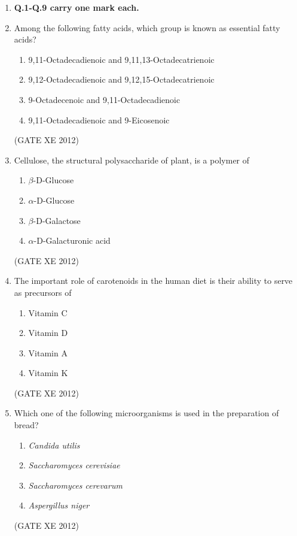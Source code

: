 \documentclass[12pt]{article}
\begin{document}
\begin{enumerate}

\item[] \textbf{Q.1-Q.9 carry one mark each.}

  \item Among the following fatty acids, which group is known as essential fatty acids?
  \begin{enumerate}
    \item 9,11-Octadecadienoic and 9,11,13-Octadecatrienoic
    \item 9,12-Octadecadienoic and 9,12,15-Octadecatrienoic
    \item 9-Octadecenoic and 9,11-Octadecadienoic
    \item 9,11-Octadecadienoic and 9-Eicosenoic
  \end{enumerate}
  (GATE XE 2012)

  \item Cellulose, the structural polysaccharide of plant, is a polymer of
  \begin{enumerate}
    \item $\beta$-D-Glucose
    \item $\alpha$-D-Glucose
    \item $\beta$-D-Galactose
    \item $\alpha$-D-Galacturonic acid
  \end{enumerate}
  (GATE XE 2012)

  \item The important role of carotenoids in the human diet is their ability to serve as precursors of
  \begin{multicols}{4}
  \begin{enumerate}
    \item Vitamin C
    \item Vitamin D
    \item Vitamin A
    \item Vitamin K
  \end{enumerate}
  \end{multicols}
  (GATE XE 2012)

  \item Which one of the following microorganisms is used in the preparation of bread?
  \begin{multicols}{2}
  \begin{enumerate}
    \item \textit{Candida utilis}
    \item \textit{Saccharomyces cerevisiae}
    \item \textit{Saccharomyces cerevarum}
    \item \textit{Aspergillus niger}
  \end{enumerate}
  \end{multicols}
  (GATE XE 2012)


\end{enumerate}
\end{document}
